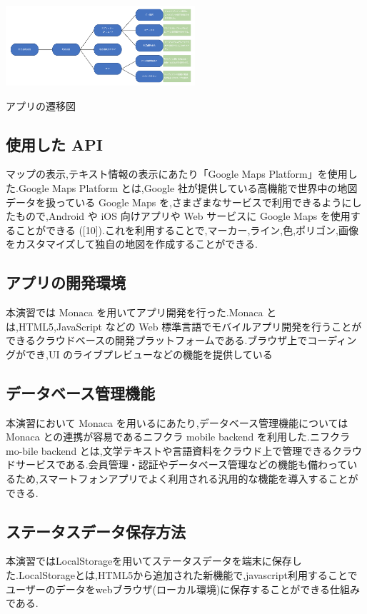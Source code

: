\documentclass[a4paper, twoside]{jarticle}
\makeatletter
\newenvironment{figurehere}
  {\def\@captype{figure}}
  {}
\makeatother
\begin{document}
\begin{multicols}{2}
\begin{figurehere}
\begin{center}
\includegraphics[bb=30 10 700 220,width=7cm]{./image13.png}%
\end{center}
\caption{アプリの遷移図}\label{fig:1}
\end{figurehere}

\subsection{使用した API}
マップの表示,テキスト情報の表示にあたり「Google Maps Platform」を使用した.Google Maps Platform とは,Google 社が提供している高機能で世界中の地図データを扱っている Google Maps を,さまざまなサービスで利用できるようにしたもので,Android や iOS 向けアプリや Web サービスに Google Maps を使用することができる ([10]).これを利用することで,マーカー,ライン,色,ポリゴン,画像をカスタマイズして独自の地図を作成することができる.

\subsection{アプリの開発環境}
本演習では Monaca を用いてアプリ開発を行った.Monaca とは,HTML5,JavaScript などの Web 標準言語でモバイルアプリ開発を行うことができるクラウドベースの開発プラットフォームである.ブラウザ上でコーディングができ,UI のライブプレビューなどの機能を提供している

\subsection{データベース管理機能}
本演習において Monaca を用いるにあたり,データベース管理機能については Monaca との連携が容易であるニフクラ mobile backend を利用した.ニフクラ mo-bile backend とは,文学テキストや言語資料をクラウド上で管理できるクラウドサービスである.会員管理・認証やデータベース管理などの機能も備わっているため,スマートフォンアプリでよく利用される汎用的な機能を導入することができる.

\subsection{ステータスデータ保存方法}
本演習ではLocalStorageを用いてステータスデータを端末に保存した.LocalStorageとは,HTML5から追加された新機能で,javascript利用することでユーザーのデータをwebブラウザ(ローカル環境)に保存することができる仕組みである.


\end{multicols}
\end{document}
